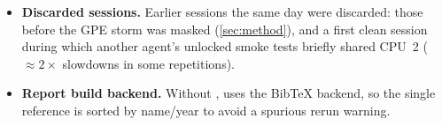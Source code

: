 \begin{itemize}
        \cref{sec:method} (repetition spread $\le1.36\times$, apparent clock
        \qtyrange{2.78}{2.79}{\giga\hertz}) are what guard the reported data.
  \item \textbf{Discarded sessions.} Earlier sessions the same day were discarded: those before the
        GPE storm was masked (\cref{sec:method}), and a first clean session during which another
        agent's unlocked smoke tests briefly shared CPU~2 ($\approx2\times$ slowdowns in some
        repetitions).
  \item \textbf{Report build backend.} Without ,  uses the BibTeX
        backend, so the single reference is sorted by name/year to avoid a spurious rerun warning.
\end{itemize}
